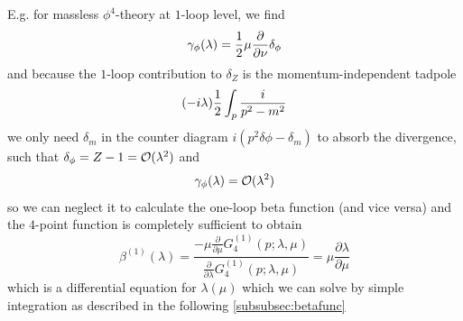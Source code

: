 E.g. for massless $\phi^4$-theory at $1$-loop level, we find
\begin{equation}
	\gamma_{\phi}(\lambda) = \frac{1}{2} \mu \frac{\partial}{\partial \nu} \delta_\phi 
\end{equation}
and because the $1$-loop contribution to $\delta_Z$ is the momentum-independent tadpole
\begin{equation}
(-i \lambda) \frac{1}{2} \int_p \frac{i}{p^2-m^2}
\end{equation}
we only need $\delta_m$ in the counter diagram $i(p^2\delta \phi-\delta_m)$ to absorb the divergence, such that $\delta_\phi=Z-1=\mathcal{O}(\lambda^2)$ and
\begin{equation}
	\gamma_\phi(\lambda) = \mathcal{O}(\lambda^2)
\end{equation}
so we can neglect it to calculate the one-loop beta function (and vice versa) and the $4$-point function is completely sufficient to obtain
\begin{equation}
	\beta^{(1)}(\lambda) = \frac{-\mu \frac{\partial}{\partial \mu} G^{(1)}_4(p;\lambda,\mu)}{\frac{\partial}{\partial \lambda} G^{(1)}_4(p;\lambda,\mu)} = \mu \frac{\partial \lambda}{\partial \mu}
\end{equation}
which is a differential equation for $\lambda(\mu)$ which we can solve by simple integration as described in the following \ref{subsubsec:betafunc}
